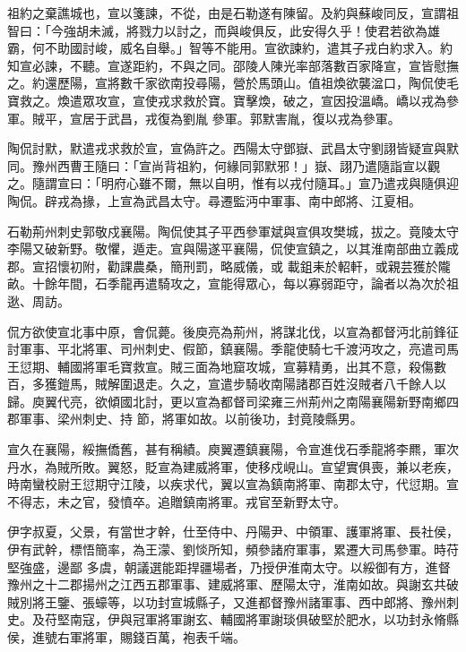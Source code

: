 \begin{pinyinscope}
 祖約之棄譙城也，宣以箋諫，不從，由是石勒遂有陳留。及約與蘇峻同反，宣謂祖智曰：「今強胡未滅，將戮力以討之，而與峻俱反，此安得久乎！使君若欲為雄霸，何不助國討峻，威名自舉。」智等不能用。宣欲諫約，遣其子戎白約求入。約知宣必諫，不聽。宣遂距約，不與之同。邵陵人陳光率部落數百家降宣，宣皆慰撫之。約還歷陽，宣將數千家欲南投尋陽，營於馬頭山。值祖煥欲襲湓口，陶侃使毛寶救之。煥遣眾攻宣，宣使戎求救於寶。寶擊煥，破之，宣因投溫嶠。嶠以戎為參軍。賊平，宣居于武昌，戎復為劉胤
 參軍。郭默害胤，復以戎為參軍。



 陶侃討默，默遣戎求救於宣，宣偽許之。西陽太守鄧嶽、武昌太守劉詡皆疑宣與默同。豫州西曹王隨曰：「宣尚背祖約，何緣同郭默邪！」嶽、詡乃遣隨詣宣以觀之。隨謂宣曰：「明府心雖不爾，無以自明，惟有以戎付隨耳。」宣乃遣戎與隨俱迎陶侃。辟戎為掾，上宣為武昌太守。尋遷監沔中軍事、南中郎將、江夏相。



 石勒荊州刺史郭敬戍襄陽。陶侃使其子平西參軍斌與宣俱攻樊城，拔之。竟陵太守李陽又破新野。敬懼，遁走。宣與陽遂平襄陽，侃使宣鎮之，以其淮南部曲立義成郡。宣招懷初附，勸課農桑，簡刑罰，略威儀，或
 載鉏耒於軺軒，或親芸獲於隴畝。十餘年間，石季龍再遣騎攻之，宣能得眾心，每以寡弱距守，論者以為次於祖逖、周訪。



 侃方欲使宣北事中原，會侃薨。後庾亮為荊州，將謀北伐，以宣為都督沔北前鋒征討軍事、平北將軍、司州刺史、假節，鎮襄陽。季龍使騎七千渡沔攻之，亮遣司馬王愆期、輔國將軍毛寶救宣。賊三面為地窟攻城，宣募精勇，出其不意，殺傷數百，多獲鎧馬，賊解圍退走。久之，宣遣步騎收南陽諸郡百姓沒賊者八千餘人以歸。庾翼代亮，欲傾國北討，更以宣為都督司梁雍三州荊州之南陽襄陽新野南鄉四郡軍事、梁州刺史、持
 節，將軍如故。以前後功，封竟陵縣男。



 宣久在襄陽，綏撫僑舊，甚有稱績。庾翼遷鎮襄陽，令宣進伐石季龍將李羆，軍次丹水，為賊所敗。翼怒，貶宣為建威將軍，使移戍峴山。宣望實俱喪，兼以老疾，時南蠻校尉王愆期守江陵，以疾求代，翼以宣為鎮南將軍、南郡太守，代愆期。宣不得志，未之官，發憤卒。追贈鎮南將軍。戎官至新野太守。



 伊字叔夏，父景，有當世才幹，仕至侍中、丹陽尹、中領軍、護軍將軍、長社侯，伊有武幹，標悟簡率，為王濛、劉惔所知，頻參諸府軍事，累遷大司馬參軍。時苻堅強盛，邊鄙
 多虞，朝議選能距捍疆場者，乃授伊淮南太守。以綏御有方，進督豫州之十二郡揚州之江西五郡軍事、建威將軍、歷陽太守，淮南如故。與謝玄共破賊別將王鑒、張蠔等，以功封宣城縣子，又進都督豫州諸軍事、西中郎將、豫州刺史。及苻堅南寇，伊與冠軍將軍謝玄、輔國將軍謝琰俱破堅於肥水，以功封永脩縣侯，進號右軍將軍，賜錢百萬，袍表千端。




\end{pinyinscope}
